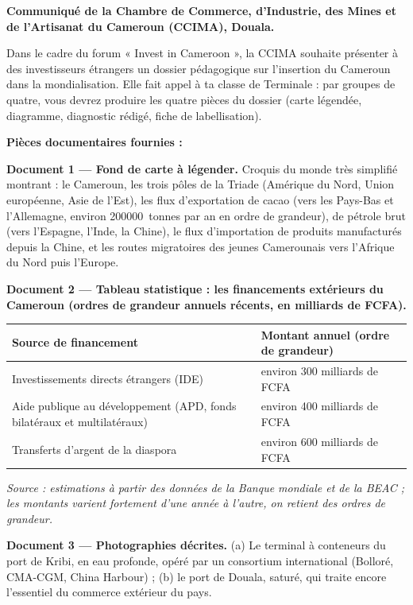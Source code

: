 \documentclass[11pt]{article}
\newcounter{popsec}
\newcounter{popsub}
\newcommand{\courssub}[1]{%
  \stepcounter{popsub}%
  \par\vspace{9pt}\noindent{\popxbold\fontsize{11.5}{13}\selectfont\color{popink}{\color{poporange}\thepopsec.\thepopsub}\hspace{6pt}#1}\par\nopagebreak\vspace{4pt}
}
\begin{document}
\courssub{Situation}

\textbf{Communiqué de la Chambre de Commerce, d'Industrie, des Mines et de l'Artisanat du Cameroun (CCIMA), Douala.}

Dans le cadre du forum « Invest in Cameroon », la CCIMA souhaite présenter à des investisseurs étrangers un dossier pédagogique sur l'insertion du Cameroun dans la mondialisation. Elle fait appel à ta classe de Terminale : par groupes de quatre, vous devrez produire les quatre pièces du dossier (carte légendée, diagramme, diagnostic rédigé, fiche de labellisation).

\textbf{Pièces documentaires fournies :}

\textbf{Document 1 — Fond de carte à légender.} Croquis du monde très simplifié montrant : le Cameroun, les trois pôles de la Triade (Amérique du Nord, Union européenne, Asie de l'Est), les flux d'exportation de cacao (vers les Pays-Bas et l'Allemagne, environ \SI{200000}{tonnes} par an en ordre de grandeur), de pétrole brut (vers l'Espagne, l'Inde, la Chine), le flux d'importation de produits manufacturés depuis la Chine, et les routes migratoires des jeunes Camerounais vers l'Afrique du Nord puis l'Europe.

\textbf{Document 2 — Tableau statistique : les financements extérieurs du Cameroun (ordres de grandeur annuels récents, en milliards de FCFA).}

\begin{center}
\begin{tabularx}{\linewidth}{|l|X|}\hline
\rowcolor{popblueL} \textbf{Source de financement} & \textbf{Montant annuel (ordre de grandeur)} \\ \hline
Investissements directs étrangers (IDE) & environ 300 milliards de FCFA \\ \hline
Aide publique au développement (APD, fonds bilatéraux et multilatéraux) & environ 400 milliards de FCFA \\ \hline
Transferts d'argent de la diaspora & environ 600 milliards de FCFA \\ \hline
\end{tabularx}
\end{center}

\emph{Source : estimations à partir des données de la Banque mondiale et de la BEAC ; les montants varient fortement d'une année à l'autre, on retient des ordres de grandeur.}

\textbf{Document 3 — Photographies décrites.} (a) Le terminal à conteneurs du port de Kribi, en eau profonde, opéré par un consortium international (Bolloré, CMA-CGM, China Harbour) ; (b) le port de Douala, saturé, qui traite encore l'essentiel du commerce extérieur du pays.
\end{document}
